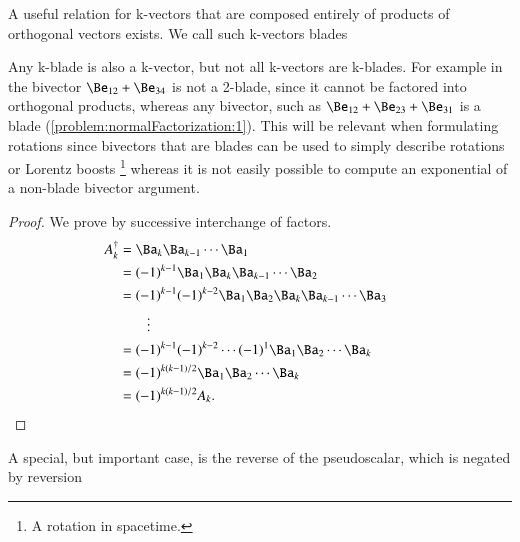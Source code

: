 %
%


A useful relation for k-vectors that are composed entirely of products of orthogonal vectors exists.  We call such k-vectors blades


Any k-blade is also a k-vector, but not all k-vectors are k-blades.  For example in  the bivector
\(
\Be_{12} + \Be_{34} \)
is not a 2-blade, since it cannot be factored into orthogonal products, whereas any  bivector, such as
\( \Be_{12} + \Be_{23} + \Be_{31} \) is a blade (\cref{problem:normalFactorization:1}).
This will be relevant when formulating rotations since bivectors that are blades can be used to simply describe rotations or Lorentz boosts
\footnote{A rotation in spacetime.} whereas it is not easily possible to compute an exponential of a non-blade bivector argument.


\begin{proof}
We prove by successive interchange of factors.
\begin{align*}
A_k^\dagger
&= \Ba_k \Ba_{k-1} \cdots \Ba_1 \\
&= (-1)^{k-1} \Ba_1 \Ba_k \Ba_{k-1} \cdots \Ba_2 \\
&= (-1)^{k-1} (-1)^{k-2} \Ba_1 \Ba_2 \Ba_k \Ba_{k-1} \cdots \Ba_3 \\
&\qquad \vdots \\
&= (-1)^{k-1} (-1)^{k-2} \cdots (-1)^1 \Ba_1 \Ba_2 \cdots \Ba_k \\
&= (-1)^{k(k-1)/2} \Ba_1 \Ba_2 \cdots \Ba_k \\
&= (-1)^{k(k-1)/2} A_k.
&&\qedhere
\end{align*}
\end{proof}

A special, but important case, is the reverse of the  pseudoscalar, which is negated by reversion

